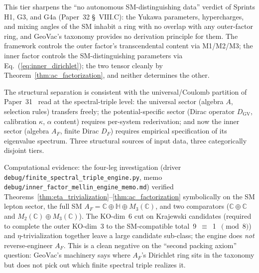 \documentclass[aps,pra,twocolumn,superscriptaddress,longbibliography]{revtex4-2}
\begin{document}
This tier sharpens the ``no autonomous SM-distinguishing data''
verdict of Sprints H1, G3, and G4a (Paper~32 \S~VIII.C): the
Yukawa parameters, hypercharges, and mixing angles of the SM
inhabit a ring with no overlap with any outer-factor ring, and
GeoVac's taxonomy provides no derivation principle for them.
The framework controls the outer factor's transcendental content
via M1/M2/M3; the inner factor controls the SM-distinguishing
parameters via Eq.~(\ref{eq:inner_dirichlet}); the two tensor
cleanly by Theorem~\ref{thm:ac_factorization}, and neither
determines the other.

The structural separation is consistent with the
universal/Coulomb partition of Paper~31~\cite{loutey_paper31} read
at the spectral-triple level: the universal sector (algebra $A$,
selection rules) transfers freely; the potential-specific sector
(Dirac operator $D_{\mathrm{GV}}$, calibration $\kappa$, $\alpha$
content) requires per-system rederivation; and now the inner
sector (algebra $A_F$, finite Dirac $D_F$) requires empirical
specification of its eigenvalue spectrum.  Three structural
sources of input data, three categorically disjoint tiers.

Computational evidence: the four-leg investigation (driver
\texttt{debug/finite\_spectral\_triple\_engine.py}, memo
\texttt{debug/inner\_factor\_mellin\_engine\_memo.md}) verified
Theorems~\ref{thm:eta_trivialization}--\ref{thm:ac_factorization}
symbolically on the SM lepton sector, the full SM
$A_F = \mathbb{C} \oplus \mathbb{H} \oplus M_3(\mathbb{C})$, and
two comparators ($\mathbb{C} \oplus \mathbb{C}$ and
$M_2(\mathbb{C}) \oplus M_3(\mathbb{C})$).  The KO-dim~6 cut
on Krajewski candidates (required to complete the outer KO-dim~3
to the SM-compatible total~9~$\equiv$~1~$\pmod 8$) and
$\eta$-trivialization together leave a large candidate
sub-class; the engine does \emph{not} reverse-engineer $A_F$.
This is a clean negative on the ``second packing axiom''
question: GeoVac's machinery says where $A_F$'s Dirichlet ring
sits in the taxonomy but does not pick out which finite spectral
triple realizes it.
\end{document}
